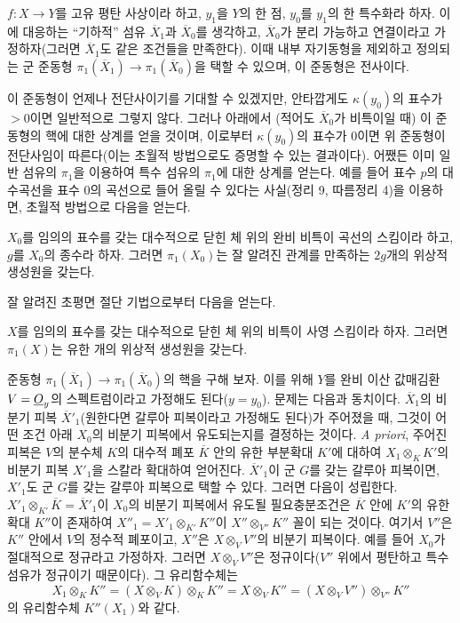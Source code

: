  $f:X\longrightarrow Y$를 고유 평탄 사상이라 하고,
$y_1$을 $Y$의 한 점, $y_0$를 $y_1$의 한 특수화라 하자. 이에 대응하는
``기하적'' 섬유 $\overline X_1$과 $\overline X_0$를 생각하고,
$\overline X_0$가 분리 가능하고 연결이라고 가정하자(그러면
$\overline X_1$도 같은 조건들을 만족한다). 이때 내부 자기동형을 제외하고
정의되는 군 준동형
$\pi_1(\overline X_1)\longrightarrow\pi_1(\overline X_0)$을 택할 수 있으며,
이 준동형은 전사이다.

이 준동형이 언제나 전단사이기를 기대할 수 있겠지만, 안타깝게도
$\kappa(y_0)$의 표수가 $>0$이면 일반적으로 그렇지 않다. 그러나 아래에서
(적어도 $\overline X_0$가 비특이일 때) 이 준동형의 핵에 대한 상계를 얻을
것이며, 이로부터 $\kappa(y_0)$의 표수가 $0$이면 위 준동형이 전단사임이
따른다(이는 초월적 방법으로도 증명할 수 있는 결과이다). 어쨌든 이미
일반 섬유의 $\pi_1$을 이용하여 특수 섬유의 $\pi_1$에 대한 상계를 얻는다.
예를 들어 표수 $p$의 대수곡선을 표수 $0$의 곡선으로 들어 올릴 수 있다는
사실(정리 9, 따름정리 4)을 이용하면, 초월적 방법으로 다음을 얻는다.

 $X_0$를 임의의 표수를 갖는 대수적으로 닫힌 체 위의
완비 비특이 곡선의 스킴이라 하고, $g$를 $X_0$의 종수라 하자. 그러면
$\pi_1(X_0)$는 잘 알려진 관계를 만족하는 $2g$개의 위상적 생성원을 갖는다.

잘 알려진 초평면 절단 기법으로부터 다음을 얻는다.

 $X$를 임의의 표수를 갖는 대수적으로 닫힌 체 위의
비특이 사영 스킴이라 하자. 그러면 $\pi_1(X)$는 유한 개의 위상적 생성원을
갖는다.

준동형 $\pi_1(\overline X_1)\longrightarrow\pi_1(\overline X_0)$의 핵을
구해 보자. 이를 위해 $Y$를 완비 이산 값매김환 $V=\underline{O}_y$의 스펙트럼이라고
가정해도 된다($y=y_0$). 문제는 다음과 동치이다. $\overline X_1$의 비분기
피복 $\overline X'_1$(원한다면 갈루아 피복이라고 가정해도 된다)가 주어졌을
때, 그것이 어떤 조건 아래 $X_0$의 비분기 피복에서 유도되는지를 결정하는
것이다. \textit{A priori}, 주어진 피복은 $V$의 분수체 $K$의 대수적 폐포
$\overline K$ 안의 유한 부분확대 $K'$에 대하여
$X_1\otimes_K K'$의 비분기 피복 $X'_1$을 스칼라 확대하여 얻어진다.
$\overline X'_1$이 군 $G$를 갖는 갈루아 피복이면, $X'_1$도 군 $G$를 갖는
갈루아 피복으로 택할 수 있다. 그러면 다음이 성립한다.
$X'_1\otimes_{K'}\overline K=\overline X'_1$이 $X_0$의 비분기 피복에서
유도될 필요충분조건은 $\overline K$ 안에 $K'$의 유한 확대 $K''$이 존재하여
$X''_1=X'_1\otimes_{K'}K''$이 $X''\otimes_{V''}K''$ 꼴이 되는 것이다.
여기서 $V''$은 $K''$ 안에서 $V$의 정수적 폐포이고, $X''$은
$X\otimes_VV''$의 비분기 피복이다. 예를 들어 $X_0$가 절대적으로
정규라고 가정하자. 그러면 $X\otimes_VV''$은 정규이다($V''$ 위에서
평탄하고 특수 섬유가 정규이기 때문이다). 그 유리함수체는
\[
  X_1\otimes_KK''
  =(X\otimes_VK)\otimes_KK''
  =X\otimes_VK''
  =(X\otimes_VV'')\otimes_{V''}K''
\]
의 유리함수체 $K''(X_1)$와 같다.

